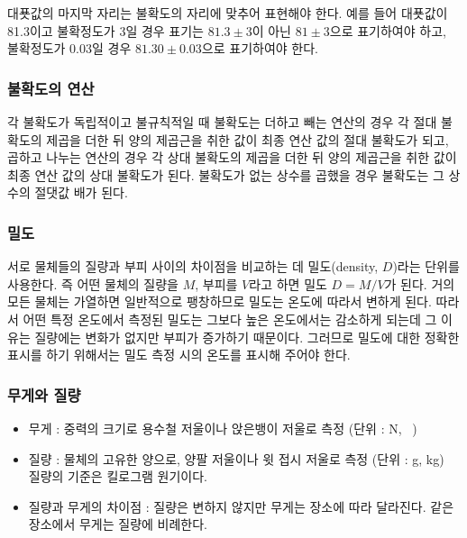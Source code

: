 \documentclass{GSHS-chemexp}
\begin{document}
	대푯값의 마지막 자리는 불확도의 자리에 맞추어 표현해야 한다.
	예를 들어 대푯값이 81.3이고 불확정도가 3일 경우 표기는 $81.3\pm 3$이 
	아닌 $81\pm3$으로 표기하여야 하고, 불확정도가 0.03일 경우 $81.30\pm 
	0.03$으로 표기하여야 한다.
	\cite{Taylor_John2}
	
	\subsubsection{불확도의 연산}
	각 불확도가 독립적이고 불규칙적일 때 불확도는
	더하고 빼는 연산의 경우 각 절대 불확도의 제곱을 더한 뒤
	양의 제곱근을 취한 값이 최종 연산 값의 절대 불확도가 되고,
	곱하고 나누는 연산의 경우 각 상대 불확도의 제곱을 더한 뒤
	양의 제곱근을 취한 값이 최종 연산 값의 상대 불확도가 된다.
	불확도가 없는 상수를 곱했을 경우 불확도는 그 상수의 절댓값 배가 된다.
	\cite{Penn}
	
	\subsubsection{밀도}
	서로 물체들의 질량과 부피 사이의 차이점을 비교하는 데
	밀도(density, $D$)라는 단위를 사용한다.
	즉 어떤 물체의 질량을 $M$, 부피를 $V$라고 하면 밀도 $D=M/V$가 된다.
	거의 모든 물체는 가열하면 일반적으로 팽창하므로
	밀도는 온도에 따라서 변하게 된다.
	따라서 어떤 특정 온도에서 측정된 밀도는
	그보다 높은 온도에서는 감소하게 되는데
	그 이유는 질량에는 변화가 없지만 부피가 증가하기 때문이다.
	그러므로 밀도에 대한 정확한 표시를 하기 위해서는
	밀도 측정 시의 온도를 표시해 주어야 한다.
		
	\subsubsection{무게와 질량}
	\begin{itemize}
		\item 무게 : 중력의 크기로 용수철 저울이나 앉은뱅이 저울로 측정
		(단위 : \si{\newton}, \si{\kilo\gramforce})
		\item 질량 : 물체의 고유한 양으로, 양팔 저울이나
		윗 접시 저울로 측정 (단위 : \si{\gram}, \si{\kilo\gram})\\
		질량의 기준은 킬로그램 원기이다.
		\item 질량과 무게의 차이점 : 질량은 변하지 않지만
		무게는 장소에 따라 달라진다.
		같은 장소에서 무게는 질량에 비례한다. 
	\end{itemize}
	
\end{document}
